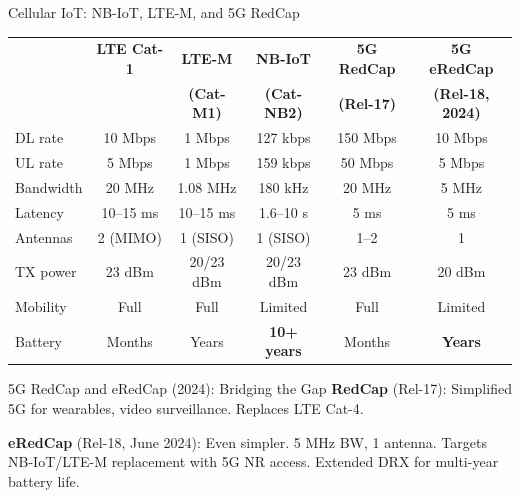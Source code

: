 \documentclass[aspectratio=169,11pt]{beamer}
\begin{document}
\begin{frame}{Cellular IoT: NB-IoT, LTE-M, and 5G RedCap}
    \footnotesize
    \begin{center}
    \begin{tabular}{lccccc}
        \toprule
        & \textbf{LTE Cat-1} & \textbf{LTE-M} & \textbf{NB-IoT} & \textbf{5G RedCap} & \textbf{5G eRedCap} \\
        & & \textbf{(Cat-M1)} & \textbf{(Cat-NB2)} & \textbf{(Rel-17)} & \textbf{(Rel-18, 2024)} \\
        \midrule
        DL rate & 10 Mbps & 1 Mbps & 127 kbps & 150 Mbps & 10 Mbps \\
        UL rate & 5 Mbps & 1 Mbps & 159 kbps & 50 Mbps & 5 Mbps \\
        Bandwidth & 20 MHz & 1.08 MHz & 180 kHz & 20 MHz & 5 MHz \\
        Latency & 10--15 ms & 10--15 ms & 1.6--10 s & 5 ms & 5 ms \\
        Antennas & 2 (MIMO) & 1 (SISO) & 1 (SISO) & 1--2 & 1 \\
        TX power & 23 dBm & 20/23 dBm & 20/23 dBm & 23 dBm & 20 dBm \\
        Mobility & Full & Full & Limited & Full & Limited \\
        Battery & Months & Years & \textbf{10+ years} & Months & \textbf{Years} \\
        \bottomrule
    \end{tabular}
    \end{center}
    \normalsize
    
    \vspace{0.2cm}
    \begin{alertblock}{5G RedCap and eRedCap (2024): Bridging the Gap}
        \textbf{RedCap} (Rel-17): Simplified 5G for wearables, video surveillance. Replaces LTE Cat-4.
        
        \textbf{eRedCap} (Rel-18, June 2024): Even simpler. 5 MHz BW, 1 antenna. Targets NB-IoT/LTE-M replacement with 5G NR access. Extended DRX for multi-year battery life.
    \end{alertblock}
\end{frame}
\end{document}
